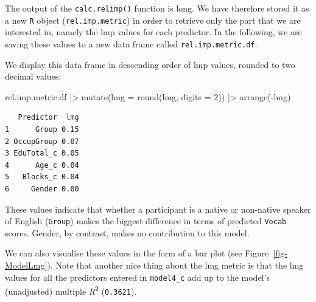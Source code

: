 \documentclass[
  letterpaper,
  DIV=11,
  numbers=noendperiod]{scrreprt}
\newenvironment{Shaded}{\begin{snugshade}}{\end{snugshade}}
\newcommand{\AttributeTok}[1]{\textcolor[rgb]{0.40,0.45,0.13}{#1}}
\newcommand{\DecValTok}[1]{\textcolor[rgb]{0.68,0.00,0.00}{#1}}
\newcommand{\FunctionTok}[1]{\textcolor[rgb]{0.28,0.35,0.67}{#1}}
\newcommand{\NormalTok}[1]{\textcolor[rgb]{0.00,0.23,0.31}{#1}}
\newcommand{\OtherTok}[1]{\textcolor[rgb]{0.00,0.23,0.31}{#1}}
\newcommand{\SpecialCharTok}[1]{\textcolor[rgb]{0.37,0.37,0.37}{#1}}
\newcommand{\StringTok}[1]{\textcolor[rgb]{0.13,0.47,0.30}{#1}}
\begin{document}
The output of the \texttt{calc.relimp()} function is long. We have
therefore stored it as a new \texttt{R} object (\texttt{rel.imp.metric})
in order to retrieve only the part that we are interested in, namely the
lmp values for each predictor. In the following, we are saving these
values to a new data frame called \texttt{rel.imp.metric.df}:

\begin{Shaded}
\end{Shaded}

We display this data frame in descending order of lmp values, rounded to
two decimal values:

\begin{Shaded}
\begin{Highlighting}[]
\NormalTok{rel.imp.metric.df }\SpecialCharTok{|\textgreater{}} 
  \FunctionTok{mutate}\NormalTok{(}\AttributeTok{lmg =} \FunctionTok{round}\NormalTok{(lmg, }\AttributeTok{digits =} \DecValTok{2}\NormalTok{)) }\SpecialCharTok{|\textgreater{}} 
  \FunctionTok{arrange}\NormalTok{(}\SpecialCharTok{{-}}\NormalTok{lmg)}
\end{Highlighting}
\end{Shaded}

\begin{verbatim}
   Predictor  lmg
1      Group 0.15
2 OccupGroup 0.07
3 EduTotal_c 0.05
4      Age_c 0.04
5   Blocks_c 0.04
6     Gender 0.00
\end{verbatim}

These values indicate that whether a participant is a native or
non-native speaker of English (\texttt{Group}) makes the biggest
difference in terms of predicted \texttt{Vocab} scores. Gender, by
contrast, makes no contribution to this model.

We can also visualise these values in the form of a bar plot (see
Figure~\ref{fig-ModelLmg}). Note that another nice thing about the lmg
metric is that the lmg values for all the predictors entered in
\texttt{model4\_c} add up to the model's (unadjusted) multiple
\emph{R}\textsuperscript{2} (\texttt{0.3621}).
\end{document}
